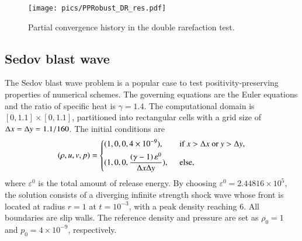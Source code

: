 
\begin{figure}[htbp!]
    \centering
    \texttt{[image: pics/PPRobust\_DR\_res.pdf]}
    \caption{Partial convergence history in the double rarefaction test.}
    \label{fig:DRres}
\end{figure}




\subsection{Sedov blast wave}
\label{ssec:sedov}

The Sedov blast wave problem \cite{zhang2012positivity,vilar2016positivity} is a popular case to test positivity-preserving properties of
numerical schemes.
The governing equations are the Euler equations and the ratio of specific heat is $\gamma = 1.4$. The computational domain is $[0,1.1]\times[0,1.1]$, partitioned into rectangular cells with a grid size of $\mathrm\Delta x = \mathrm\Delta y = 1.1/160$. The initial conditions are
\begin{equation}
    (\rho,u,v,p) = \begin{dcases}
        (1,0,0,4\times 10 ^{-9}),\ \                                          & \text{if } x > \inc x \ \mathrm{or} \ y > \inc y, \\
        (1,0,0,\dfrac{\left(\gamma-1\right)\varepsilon^0}{\inc x\inc y}),\ \  & \text{else},                                      \\
    \end{dcases}
\end{equation}
where $\varepsilon^0$ is the total amount of release energy.
By choosing $\varepsilon^0= 2.44816\times 10^5$,
the solution consists of a diverging infinite strength shock wave
whose front is located at radius $r=1$ at $t=10^{-3}$, with a peak density reaching $6$.
All boundaries are slip walls.
The reference density and pressure are set as $\rho_0=1$ and $p_0=4\times10^{-9}$, respectively.

